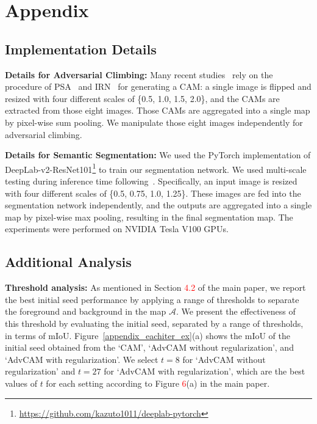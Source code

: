 \documentclass[final]{cvpr}
\begin{document}
\section{Appendix}
\subsection{Implementation Details}
\textbf{Details for Adversarial Climbing:}
Many recent studies~\cite{wang2020self, chang2020weakly, zhang2020causal} rely on the procedure of PSA~\cite{ahn2018learning} and IRN~\cite{ahn2019weakly} for generating a CAM: a single image is flipped and resized with four different scales of \{0.5, 1.0, 1.5, 2.0\}, and the CAMs are extracted from those eight images. Those CAMs are aggregated into a single map by pixel-wise sum pooling.
We manipulate those eight images independently for adversarial climbing.


\textbf{Details for Semantic Segmentation:} 
We used the PyTorch implementation of DeepLab-v2-ResNet101\footnote{\url{https://github.com/kazuto1011/deeplab-pytorch}} to train our segmentation network.
We used multi-scale testing during inference time following~\cite{wang2020self, ahn2019weakly, ahn2018learning, lee2019ficklenet, lee2019frame}. Specifically, an input image is resized with four different scales of \{0.5, 0.75, 1.0, 1.25\}. These images are fed into the segmentation network independently, and the outputs are aggregated into a single map by pixel-wise max pooling, resulting in the final segmentation map. The experiments were performed on NVIDIA Tesla V100 GPUs.


\subsection{Additional Analysis}

\textbf{Threshold analysis:} 
As mentioned in Section \textcolor{red}{4.2} of the main paper, we report the best initial seed performance by applying a range of thresholds to separate the foreground and background in the map $\mathcal{A}$. 
We present the effectiveness of this threshold by evaluating the initial seed, separated by a range of thresholds, in terms of mIoU. Figure~\ref{appendix_eachiter_ex}(a) shows the mIoU of the initial seed obtained from the `CAM', `AdvCAM without regularization', and `AdvCAM with regularization'. We select $t=8$ for `AdvCAM without regularization' and $t=27$ for `AdvCAM with regularization', which are the best values of $t$ for each setting according to Figure \textcolor{red}{6}(a) in the main paper.
\end{document}
